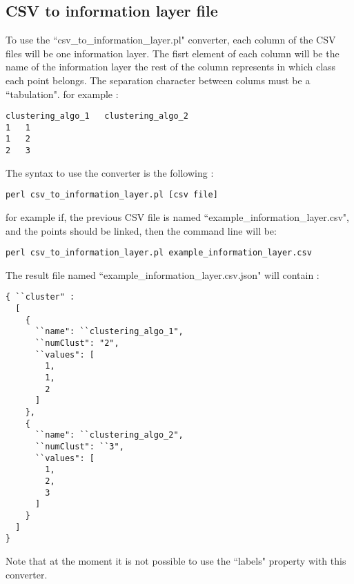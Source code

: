 \documentclass{bioinfo}
\begin{document}
\subsection{CSV to information layer file}
To use the ``csv_to_information_layer.pl" converter, each column of the CSV files will be one information layer. The fisrt element of each column will be the name of the information layer the rest of the column represents in which class each point belongs. The separation character between colums must be a ``tabulation". for example :
\begin{lstlisting}
clustering_algo_1	clustering_algo_2
1	1
1	2
2	3
\end{lstlisting}
The syntax to use the converter is the following :
\begin{lstlisting}
perl csv_to_information_layer.pl [csv file]
\end{lstlisting}
for example if, the previous CSV file is named ``example_information_layer.csv", and the points should be linked, then the command line will be:
\begin{lstlisting}
perl csv_to_information_layer.pl example_information_layer.csv
\end{lstlisting}
The result file named ``example_information_layer.csv.json" will contain :
\begin{lstlisting}
{ ``cluster" :
  [
    {
      ``name": ``clustering_algo_1",
      ``numClust": "2",
      ``values": [
        1,
        1,
        2
      ]
    },
    {
      ``name": ``clustering_algo_2",
      ``numClust": ``3",
      ``values": [
        1,
        2,
        3
      ]
    }
  ]
}
\end{lstlisting}
Note that at the moment it is not possible to use the ``labels" property with this converter.
\end{document}

